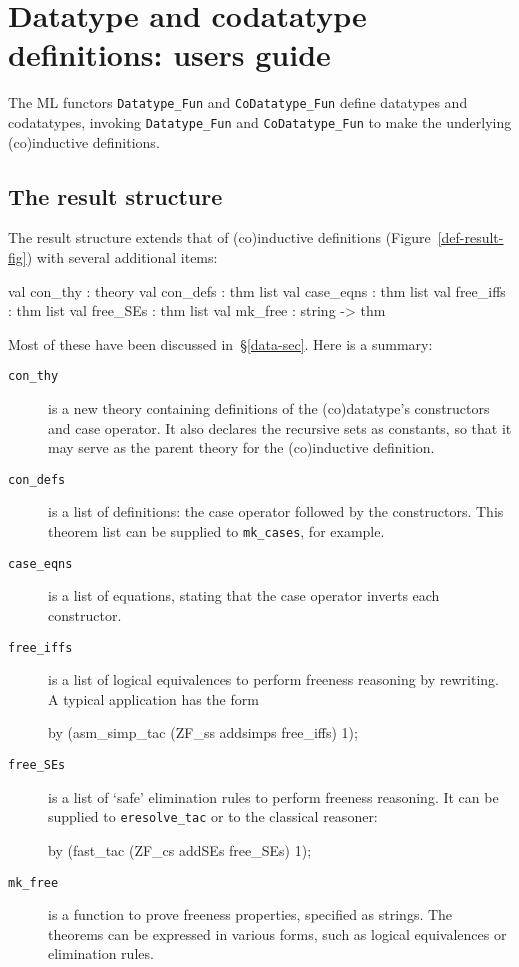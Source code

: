 \section{Datatype and codatatype definitions: users guide}
The ML functors \verb|Datatype_Fun| and \verb|CoDatatype_Fun| define datatypes
and codatatypes, invoking \verb|Datatype_Fun| and
\verb|CoDatatype_Fun| to make the underlying (co)inductive definitions. 


\subsection{The result structure}
The result structure extends that of (co)inductive definitions
(Figure~\ref{def-result-fig}) with several additional items:
\begin{ttbox}
val con_thy   : theory
val con_defs  : thm list
val case_eqns : thm list
val free_iffs : thm list
val free_SEs  : thm list
val mk_free   : string -> thm
\end{ttbox}
Most of these have been discussed in~\S\ref{data-sec}.  Here is a summary:
\begin{description}
\item[\tt con\_thy] is a new theory containing definitions of the
(co)datatype's constructors and case operator.  It also declares the
recursive sets as constants, so that it may serve as the parent
theory for the (co)inductive definition.

\item[\tt con\_defs] is a list of definitions: the case operator followed by
the constructors.  This theorem list can be supplied to \verb|mk_cases|, for
example.

\item[\tt case\_eqns] is a list of equations, stating that the case operator
inverts each constructor.

\item[\tt free\_iffs] is a list of logical equivalences to perform freeness
reasoning by rewriting.  A typical application has the form
\begin{ttbox}
by (asm_simp_tac (ZF_ss addsimps free_iffs) 1);
\end{ttbox}

\item[\tt free\_SEs] is a list of `safe' elimination rules to perform freeness
reasoning.  It can be supplied to \verb|eresolve_tac| or to the classical
reasoner:
\begin{ttbox} 
by (fast_tac (ZF_cs addSEs free_SEs) 1);
\end{ttbox}

\item[\tt mk\_free] is a function to prove freeness properties, specified as
strings.  The theorems can be expressed in various forms, such as logical
equivalences or elimination rules.
\end{description}

